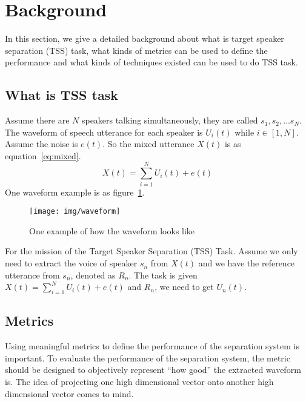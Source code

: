 

\section{Background}\label{sec:background}

In this section, we give a detailed background about what is target speaker separation (TSS) task, what kinds of metrics can be used to define the performance and what kinds of techniques existed can be used to do TSS task.

\subsection{What is TSS task}\label{subsec:what-is-tss-task}

Assume there are $N$ speakers talking simultaneously, they are called $s_1, s_2, \dots s_N$. The waveform of speech utterance for each speaker is $U_i\left( t \right)$ while $i\in\left[ 1, N \right]$. Assume the noise is $e\left( t \right)$.
So the mixed utterance $X\left( t \right)$ is as equation~\ref{eq:mixed}.
\begin{equation}
    X\left( t \right) = \sum\limits_{i=1}^N U_i\left( t \right) + e\left( t \right)
    \label{eq:mixed}
\end{equation}
One waveform example is as figure~\ref{fig:waveform}.
\begin{figure}[!htbp]
    \centering
    \texttt{[image: img/waveform]}
    \caption{One example of how the waveform looks like}
    \label{fig:waveform}
\end{figure}

For the mission of the Target Speaker Separation (TSS) Task. Assume we only need to extract the voice of speaker $s_n$ from $X\left( t \right)$ and we have the reference utterance from $s_n$, denoted as $R_n$.
The task is given $X\left( t \right) = \sum\limits_{i=1}^N U_i\left( t \right) + e\left( t \right)$ and $R_n$, we need to get $U_n\left( t \right)$.

\subsection{Metrics}\label{subsec:metrics}

Using meaningful metrics to define the performance of the separation system is important.
To evaluate the performance of the separation system, the metric should be designed to objectively represent ``how good'' the extracted waveform is.
The idea of projecting one high dimensional vector onto another high dimensional vector comes to mind.

